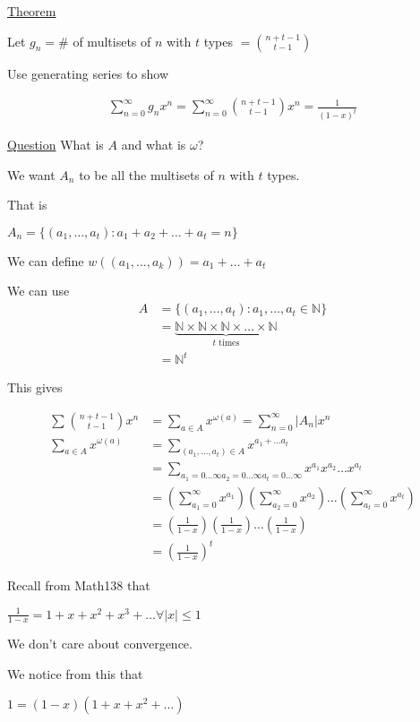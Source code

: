 \documentclass{article}
\begin{document}
\underline{Theorem}

Let $g_n = \#$ of multisets of $n$ with $t$ types $= \binom{n+t-1}{t-1}$

Use generating series to show

\begin{align*}
    \sum_{n=0}^{\infty}g_nx^n = \sum_{n=0}^{\infty}\binom{n+t-1}{t-1}x^n = \frac{1}{(1-x)^t}
\end{align*}

\underline{Question} What is $A$ and what is $\omega$?

We want $A_n$ to be all the multisets of $n$ with $t$ types. 

That is 

$A_n = \{(a_1,\ldots,a_t): a_1 + a_2 + \ldots + a_t = n\}$

We can define $w((a_1,\ldots,a_k))=a_1 + \ldots + a_t$

We can use 
\begin{align*}
A &= \{(a_1,\ldots,a_t):a_1,\ldots,a_t \in \mathbb{N}\} \\
&= \underbrace{\mathbb{N} \times \mathbb{N} \times \mathbb{N} \times \ldots \times \mathbb{N}}_{t \text{ times}} \\
&= \mathbb{N}^t
\end{align*}

This gives

\begin{align*}
    \sum_{}^{}\binom{n+t-1}{t-1}x^n &= \sum_{a \in A}x^{\omega(a)} = \sum_{n=0}^{\infty}|A_n|x^n \\
    \sum_{a \in A}x^{\omega(a)} &= \sum_{(a_1,\ldots,a_t)\in A} x^{a_1 + \ldots a_t} \\
    &= \sum_{a_1 = 0 \ldots \infty a_2 = 0 \ldots \infty a_t = 0 \ldots \infty}^{} x^{a_1}x^{a_2}\ldots x^{a_t} \\
    &= (\sum_{a_1=0}^{\infty}x^{a_1})(\sum_{a_2=0}^{\infty}x^{a_2})\ldots(\sum_{a_t=0}^{\infty}x^{a_t}) \\
    &= (\frac{1}{1-x})(\frac{1}{1-x})\ldots(\frac{1}{1-x}) \\
    &= (\frac{1}{1-x})^t
\end{align*}

Recall from Math138 that 

$\frac{1}{1-x} = 1+x+x^2+x^3+\ldots \forall |x| \le 1$

We don't care about convergence. 

We notice from this that

$1 = (1-x)(1+x+x^2+\ldots)$
\end{document}
